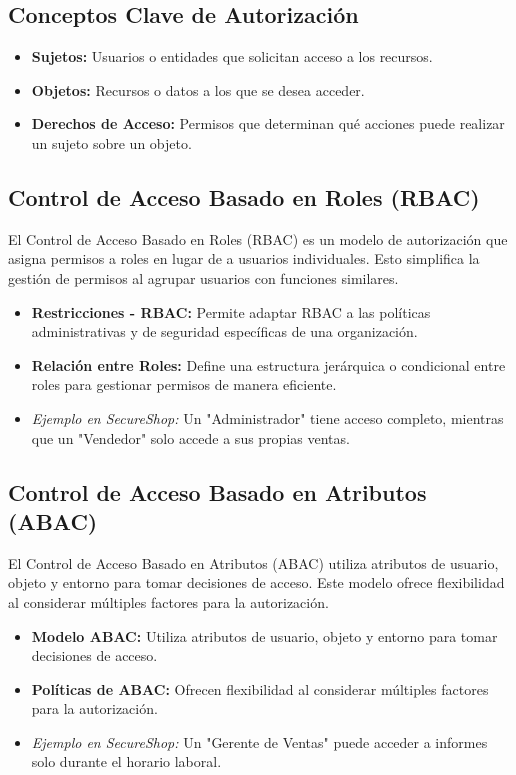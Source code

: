 \subsection{Conceptos Clave de Autorización}

\begin{itemize}
    \item \textbf{Sujetos:} Usuarios o entidades que solicitan acceso a los recursos.
    \item \textbf{Objetos:} Recursos o datos a los que se desea acceder.
    \item \textbf{Derechos de Acceso:} Permisos que determinan qué acciones puede realizar un sujeto sobre un objeto.
\end{itemize}

\subsection{Control de Acceso Basado en Roles (RBAC)}

El Control de Acceso Basado en Roles (RBAC) es un modelo de autorización que asigna permisos a roles en lugar de a usuarios individuales. Esto simplifica la gestión de permisos al agrupar usuarios con funciones similares.

\begin{itemize}
    \item \textbf{Restricciones - RBAC:} Permite adaptar RBAC a las políticas administrativas y de seguridad específicas de una organización.
    \item \textbf{Relación entre Roles:} Define una estructura jerárquica o condicional entre roles para gestionar permisos de manera eficiente.
    \item \textit{Ejemplo en SecureShop:} Un "Administrador" tiene acceso completo, mientras que un "Vendedor" solo accede a sus propias ventas.
\end{itemize}

\subsection{Control de Acceso Basado en Atributos (ABAC)}

El Control de Acceso Basado en Atributos (ABAC) utiliza atributos de usuario, objeto y entorno para tomar decisiones de acceso. Este modelo ofrece flexibilidad al considerar múltiples factores para la autorización.

\begin{itemize}
    \item \textbf{Modelo ABAC:} Utiliza atributos de usuario, objeto y entorno para tomar decisiones de acceso.
    \item \textbf{Políticas de ABAC:} Ofrecen flexibilidad al considerar múltiples factores para la autorización.
    \item \textit{Ejemplo en SecureShop:} Un "Gerente de Ventas" puede acceder a informes solo durante el horario laboral.
\end{itemize}

